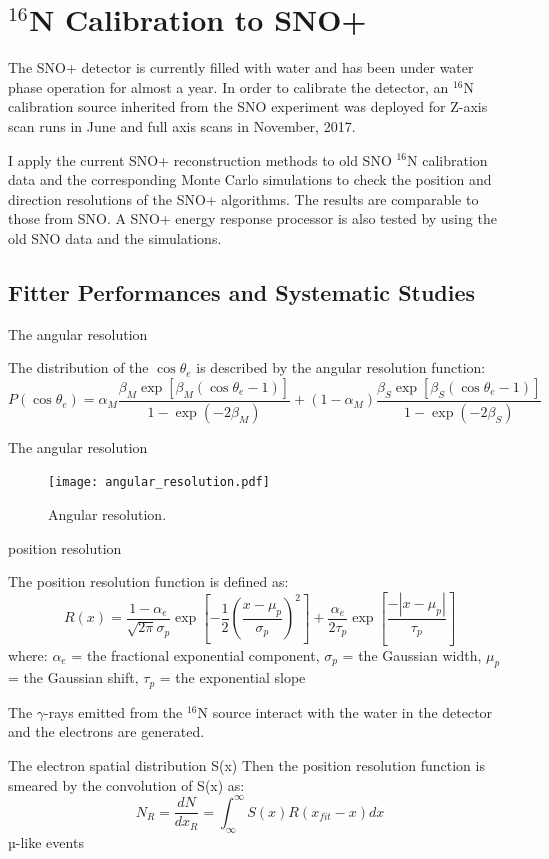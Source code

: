 \documentclass[preprint,12pt]{elsarticle}
\begin{document}
\section{$^{16}$N Calibration to SNO+}
The SNO+ detector is currently filled with water and has been under water phase operation for almost a year. In order to calibrate the detector, an $^{16}$N calibration source inherited from the SNO experiment was deployed for Z-axis scan runs in June and full axis scans in November, 2017. 

I apply the current SNO+ reconstruction methods to old SNO $^{16}$N calibration data and the corresponding Monte Carlo simulations to check the position and direction resolutions of the SNO+ algorithms. The results are comparable to those from SNO. A SNO+ energy response processor is also tested by using the old SNO data and the simulations. 

 
\subsection{Fitter Performances and Systematic Studies}


The angular resolution

The distribution of the $\cos\theta_e$ is described by the angular resolution function\cite{boulay}:
\begin{equation}
P(\cos\theta_e)=\alpha_M\frac{\beta_M\exp[\beta_M(\cos\theta_e-1)]}{1-\exp(-2\beta_M)}+(1-\alpha_M)\frac{\beta_S\exp[\beta_S(\cos\theta_e-1)]}{1-\exp(-2\beta_S)}
\end{equation}

The angular resolution 
\begin{figure}[!htb]
	\centering
	\texttt{[image: angular\_resolution.pdf]}
	\caption{Angular resolution.}
	\label{angular}
\end{figure}


position resolution

The position resolution function is defined as:
\[
  R(x)=\frac{1-\alpha_e}{\sqrt{2\pi}\sigma_p}\exp{[-\frac{1}{2}(\frac{x-\mu_p}{\sigma_p})^2]+\frac{\alpha_e}{2\tau_p}\exp{[\frac{-|x-\mu_p|}{\tau_p}]}}
\]
where: $\alpha_e$ = the fractional exponential component, $\sigma_p$ =
the Gaussian width, $\mu_p$ = the Gaussian shift, $\tau_p$ = the
exponential slope


The $\gamma$-rays emitted from the $^{16}$N source interact with the
water in the detector and the electrons are generated.

The electron spatial distribution S(x) Then the position resolution
function is smeared by the convolution of S(x) as:
\[
  N_{R}=\frac{dN}{dx_R}=\int^\infty_\infty S(x)R(x_{fit}-x)dx
\]µ-like events
\end{document}
